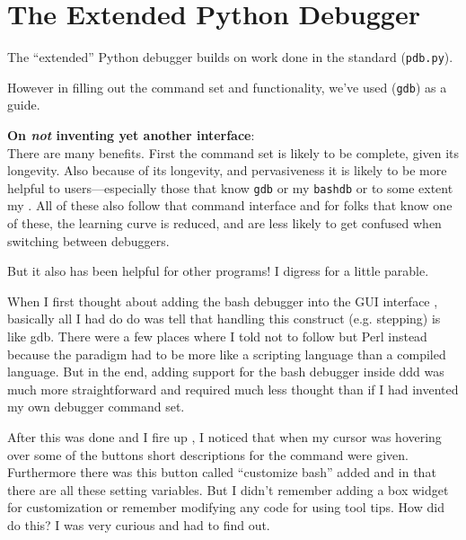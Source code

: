 \chapter{The Extended Python Debugger \label{extdebugger}}


The ``extended'' Python debugger builds on work done in the standard
 ({\tt pdb.py}).

However in filling out the command set and functionality, we've used
 ({\tt gdb})
as a guide.

{\bf On \emph{not} inventing yet another interface}:\\
There are many benefits. First the command set is likely to be
complete, given its longevity. Also because of its longevity, and
pervasiveness it is likely to be more helpful to users---especially
those that know {\tt gdb} or my  {\tt bashdb} or to some
extent my . All of these also
follow that command interface and for folks that know one of these,
the learning curve is reduced, and are less likely to get confused
when switching between debuggers.

But it also has been helpful for other programs! I digress for a
little parable.

When I first thought about adding the bash debugger into the GUI
interface , basically all I had
do do was tell  that handling this construct (e.g. stepping)
is like gdb. There were a few places where I told  not to
follow  but Perl instead because the paradigm had to be more
like a scripting language than a compiled language. But in the end,
adding support for the bash debugger inside ddd was much more
straightforward and required much less thought than if I had invented
my own debugger command set.

After this was done and I fire up , I noticed that when my
cursor was hovering over some of the buttons short descriptions for
the command were given. Furthermore there was this button called
``customize bash'' added and in that there are all these setting
variables. But I didn't remember adding a box widget for customization
or remember modifying any code for using tool tips. How did  do
this? I was very curious and had to find out.

